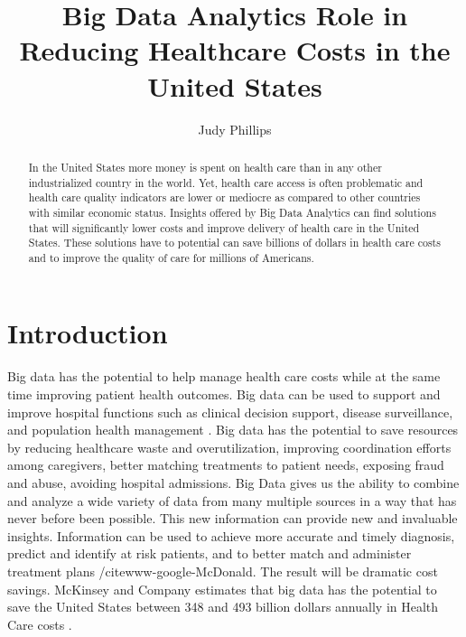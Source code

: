 \documentclass[sigconf]{acmart}
\begin{document}
\title{Big Data Analytics Role in Reducing Healthcare Costs in the United States}


\author{Judy Phillips}


\begin{abstract}
In the United States more money is spent on health care than in any other industrialized country in the world. Yet, health care access is often problematic and health care quality indicators are lower or mediocre as compared to other countries with similar economic status. Insights offered by Big Data Analytics can find solutions that will significantly lower costs and improve delivery of health care in the United States.  These solutions have to potential can save billions of dollars in health care costs and to improve the quality of care for millions of Americans. 
\end{abstract}



\maketitle

\section{Introduction}

Big data has the potential to help manage health care costs while at the same time improving patient health outcomes. Big data can be used to support and improve hospital functions such as clinical decision support, disease surveillance, and population health management \cite{www-google-springer}. Big data has the potential to save resources by reducing healthcare waste and overutilization, improving coordination efforts among caregivers, better matching treatments to patient needs, exposing fraud and abuse, avoiding hospital admissions.  Big Data gives us the ability to combine and analyze a wide variety of data from many multiple sources in a way that has never before been possible. This new information can provide new and invaluable insights. Information can be used to achieve more accurate and timely diagnosis, predict and identify at risk patients, and to better match and administer treatment plans /cite{www-google-McDonald}. The result will be dramatic cost savings. McKinsey and Company estimates that big data has the potential to save the United States between 348 and 493 billion dollars annually in Health Care costs \cite{www-google-CIO}.
\end{document}
